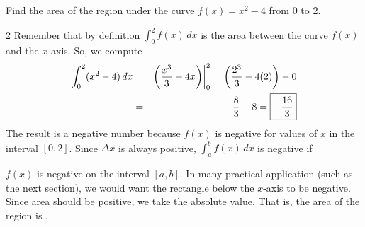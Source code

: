 \documentclass{book}
\newcommand{\dx}{\,dx}
\newcommand{\dint}{\displaystyle \int}
\begin{document}
\begin{Exam} Find the area of the region under the curve $f(x) = x^2-4$ from $0$ to 2. 
\begin{multicols}{2}
Remember that by definition $\displaystyle \int_0^2 f(x)\dx$ is the area between the curve $f(x)$ and the $x$-axis.  So, we compute 
\begin{eqnarray*}
\int_0^2 (x^2-4)\dx &=& \bigg(\dfrac{x^3}{3} - 4x\bigg)\bigg|_0^2  = \bigg(\dfrac{2^3}{3} - 4(2)\bigg) - 0\\
&=& \dfrac{8}{3}- 8  = \fbox{$-\dfrac{16}{3}$}
\end{eqnarray*}
The result is a negative number because $f(x)$ is negative for values of $x$ in the interval $[0,2]$. Since $\Delta x$ is always positive, $\dint_a^b f(x)\dx$ is negative if \columnbreak
\begin{center}
\end{center}
\end{multicols}\vspace{-12pt}
$f(x)$ is negative on the interval $[a,b]$. In many practical application (such as the next section), we would want the rectangle below the $x$-axis to be negative. Since area should be positive, we take the absolute value. That is, the area of the region is .
\end{Exam}\vs
\end{document}
